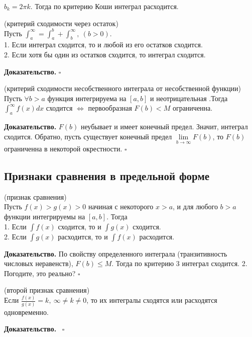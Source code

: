 $b_k=2\pi k$. Тогда по критерию Коши интеграл расходится.
\begin{theor} (критерий сходимости через остаток)\\
Пусть $\int^\infty_a=\int^b_a+\int^\infty_b,~(b>0)$.\\
1. Если интеграл сходится, то и любой из его остатков сходится.\\
2. Если хотя бы один из остатков сходится, то интеграл сходится.
\end{theor}
\textbf{Доказательство.}  
$\square$ 
\begin{theor} (критерий сходимости несобственного интеграла от несобственной
функции)\\
Пусть $\forall b>a$ функция интегрируема на $[a,b]$ и неотрицательная .Тогда
$\int^\infty_af(x)dx$ сходится $\Leftrightarrow$ первообразная $F(b)<M$ 
ограниченна.
\end{theor}
\textbf{Доказательство.} $F(b)$ неубывает и имеет конечный предел. Значит,
интеграл сходится. Обратно, пусть существует конечный предел 
$\lim\limits_{b \to \infty} F(b)$, то $F(b)$ ограниченна в некоторой 
окрестности. $\square$\\
\subsection{Признаки сравнения в предельной форме}
\begin{theor} (признак сравнения)\\
Пусть $f(x)>g(x)>0$ начиная с некоторого $x>a$, и для любого  $b>a$
функции интегрируемы на $[a,b]$. Тогда\\
1. Если  $\int f(x)$ сходится, то и  $\int g(x)$  сходится.\\
2. Если  $\int g(x)$ расходится, то и $\int f(x)$ расходится.
\end{theor}
\textbf{Доказательство.}  По свойству определенного интеграла (транзитивность 
числовых неравенств), $F(b)\leqslant M$. Тогда по критерию 3 интеграл 
сходится.
2. Погодите, это реально?
$\square$ 
\begin{theor} (второй признак сравнения)\\
Если $\frac{f(x)}{g(x)}=k,~\infty\ne k\ne0$, то их интегралы сходятся или
расходятся одновременно. 
\end{theor}
\textbf{Доказательство.}  \
$\square$ 





















